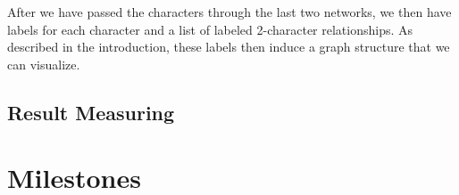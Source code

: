 \documentclass[12pt]{article}
\begin{document}
    After we have passed the characters through the last two networks, we then have labels for each character and a list of labeled 2-character relationships. As described in the introduction, these labels then induce a graph structure that we can visualize. 

\subsection{Result Measuring}
\section{Milestones}
\end{document}
